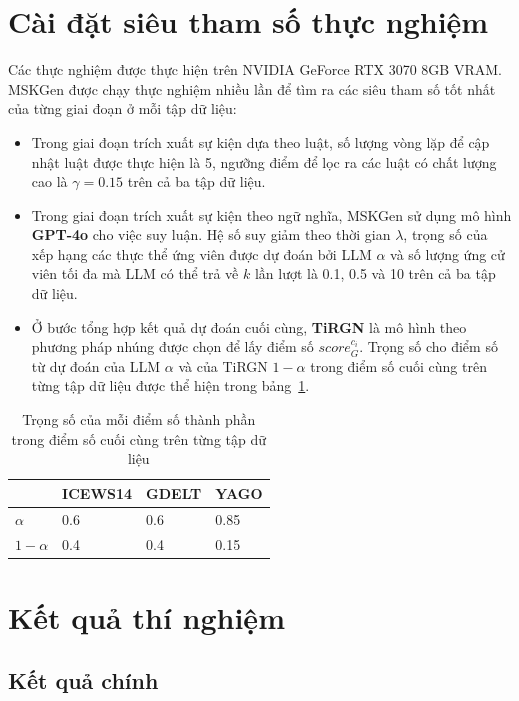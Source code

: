 \section{Cài đặt siêu tham số thực nghiệm}
Các thực nghiệm được thực hiện trên NVIDIA GeForce RTX 3070 8GB VRAM. MSKGen được chạy thực nghiệm nhiều lần để tìm ra các siêu tham số
tốt nhất của từng giai đoạn ở mỗi tập dữ liệu:
\begin{itemize}
    \item Trong giai đoạn trích xuất sự kiện dựa theo luật, số lượng vòng lặp để cập nhật luật được thực hiện là 5, 
ngưỡng điểm để lọc ra các luật có chất lượng cao là $\gamma = 0.15$ trên cả ba tập dữ liệu.
    \item Trong giai đoạn trích xuất sự kiện theo ngữ nghĩa, MSKGen sử dụng mô hình \textbf{GPT-4o} cho việc suy luận. 
    Hệ số suy giảm theo thời gian $\lambda$, trọng số của xếp hạng các thực thể ứng viên được dự đoán bởi LLM $\alpha$ và
    số lượng ứng cử viên tối đa mà LLM có thể trả về $k$ lần lượt là 0.1, 0.5 và 10 trên cả ba tập dữ liệu. 
    \item Ở bước tổng hợp kết quả dự đoán cuối cùng, \textbf{TiRGN} là mô hình theo phương pháp nhúng được chọn để lấy điểm số $score_{G}^{c_i}$. 
    Trọng số cho điểm số từ dự đoán của LLM $\alpha$ và của TiRGN $1 - \alpha$
    trong điểm số cuối cùng trên từng tập dữ liệu được thể hiện trong bảng~\ref{tab:table53}.
\end{itemize}

\begin{table}[H]
\caption{Trọng số của mỗi điểm số thành phần trong điểm số cuối cùng trên từng tập dữ liệu}
\label{tab:table53}
\begin{adjustbox}{width=\textwidth}
\begin{tabular}{|l|l|l|l|}
\hline
           & ICEWS14 & GDELT & YAGO \\ \hline
$\alpha$   & 0.6     & 0.6   & 0.85 \\ \hline
$1-\alpha$ & 0.4     & 0.4   & 0.15 \\ \hline
\end{tabular}
\end{adjustbox}  
\end{table}
  

\section{Kết quả thí nghiệm}
\subsection{Kết quả chính}

